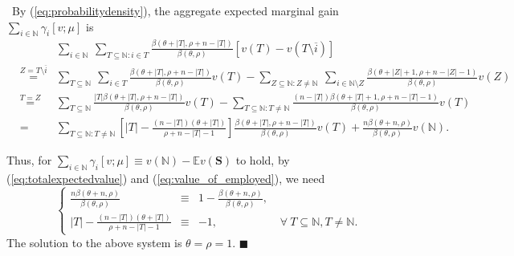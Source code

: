 \documentclass[a4paper,12pt]{article}
\begin{document}
\noindent
{} \
By (\ref{eq:probabilitydensity}), the aggregate expected marginal gain
$\sum\limits_{i\in \mathbb{N}}  \gamma_i [v;\mu]$ is
\begin{equation}\label{eq:value_of_employed}\tag{A.17}
\begin{array}{rcl}
&&
\sum\limits_{i\in \mathbb{N}}\ \sum\limits_{T\subseteq \mathbb{N}: i \in T} \frac{\beta(\theta+|T|, \rho+n-|T|)}{\beta(\theta,\rho)}[v(T)-v(T\setminus\overline{i})] \\

&\stackrel{Z=T\setminus\overline{i}}=&
\sum\limits_{T\subseteq \mathbb{N}}\ \sum\limits_{i\in T} \frac{\beta(\theta+|T|, \rho+n-|T|)}{\beta(\theta,\rho)}v(T)
- \sum\limits_{Z\subseteq \mathbb{N}: Z\not = \mathbb{N}}\ \sum\limits_{i \in \mathbb{N}\setminus Z}  \frac{\beta(\theta+|Z|+1, \rho+n-|Z|-1)}{\beta(\theta,\rho)} v(Z) \\

&\stackrel{T=Z}=& 
\sum\limits_{T\subseteq \mathbb{N}}\frac{|T| \beta(\theta+|T|, \rho+n-|T|)}{\beta(\theta,\rho)}v(T)
- \sum\limits_{T\subseteq \mathbb{N}: T\not = \mathbb{N}} \frac{(n-|T|) \beta(\theta+|T|+1, \rho+n-|T|-1)}{\beta(\theta,\rho)} v(T) \\

&=& 
\sum\limits_{T\subseteq \mathbb{N}: T\not = \mathbb{N}}\left [  |T| - \frac{(n-|T|) (\theta+|T|)}{\rho+n-|T|-1} \right ] \frac{\beta(\theta+|T|, \rho+n-|T|)}{\beta(\theta,\rho)}v(T) + \frac{n\beta(\theta+n,\rho)}{\beta(\theta,\rho)}v(\mathbb{N}).

\end{array}
\end{equation}

Thus, for $\sum\limits_{i\in \mathbb{N}}  \gamma_i [v;\mu] \equiv v(\mathbb{N}) - \mathbb{E} v(\mathbf{S})$ to hold, by (\ref{eq:totalexpectedvalue}) and (\ref{eq:value_of_employed}), we need
$$
\left \{
\begin{array}{rcll}
\frac{n\beta(\theta+n,\rho)}{\beta (\theta, \rho)} &\equiv&1 - \frac{\beta(\theta+n,\rho)}{\beta(\theta,\rho)},& \\
|T| - \frac{(n-|T|) (\theta+|T|)}{\rho+n-|T|-1}        &\equiv&-1, \hspace{2cm} & \forall \ T\subseteq \mathbb{N}, T\not = \mathbb{N}.
\end{array}
\right .
$$
The solution to the above system is $\theta=\rho=1$.  \hspace{1cm} $\blacksquare$
\end{document}
